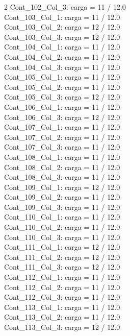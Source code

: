 \begin{multicols}{2}
Cont\_102\_Col\_3: carga = 11 / 12.0\\
Cont\_103\_Col\_1: carga = 11 / 12.0\\
Cont\_103\_Col\_2: carga = 12 / 12.0\\
Cont\_103\_Col\_3: carga = 12 / 12.0\\
Cont\_104\_Col\_1: carga = 11 / 12.0\\
Cont\_104\_Col\_2: carga = 11 / 12.0\\
Cont\_104\_Col\_3: carga = 11 / 12.0\\
Cont\_105\_Col\_1: carga = 11 / 12.0\\
Cont\_105\_Col\_2: carga = 11 / 12.0\\
Cont\_105\_Col\_3: carga = 12 / 12.0\\
Cont\_106\_Col\_1: carga = 11 / 12.0\\
Cont\_106\_Col\_3: carga = 12 / 12.0\\
Cont\_107\_Col\_1: carga = 11 / 12.0\\
Cont\_107\_Col\_2: carga = 11 / 12.0\\
Cont\_107\_Col\_3: carga = 11 / 12.0\\
Cont\_108\_Col\_1: carga = 11 / 12.0\\
Cont\_108\_Col\_2: carga = 11 / 12.0\\
Cont\_108\_Col\_3: carga = 11 / 12.0\\
Cont\_109\_Col\_1: carga = 12 / 12.0\\
Cont\_109\_Col\_2: carga = 11 / 12.0\\
Cont\_109\_Col\_3: carga = 11 / 12.0\\
Cont\_110\_Col\_1: carga = 11 / 12.0\\
Cont\_110\_Col\_2: carga = 11 / 12.0\\
Cont\_110\_Col\_3: carga = 11 / 12.0\\
Cont\_111\_Col\_1: carga = 12 / 12.0\\
Cont\_111\_Col\_2: carga = 12 / 12.0\\
Cont\_111\_Col\_3: carga = 12 / 12.0\\
Cont\_112\_Col\_1: carga = 11 / 12.0\\
Cont\_112\_Col\_2: carga = 11 / 12.0\\
Cont\_112\_Col\_3: carga = 11 / 12.0\\
Cont\_113\_Col\_1: carga = 11 / 12.0\\
Cont\_113\_Col\_2: carga = 11 / 12.0\\
Cont\_113\_Col\_3: carga = 12 / 12.0\\

\end{multicols}
